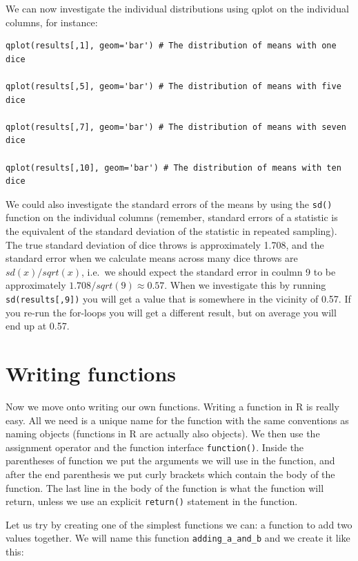\documentclass[
]{book}
\begin{document}
We can now investigate the individual distributions using qplot on the individual columns, for instance:

\begin{verbatim}
qplot(results[,1], geom='bar') # The distribution of means with one dice

qplot(results[,5], geom='bar') # The distribution of means with five dice

qplot(results[,7], geom='bar') # The distribution of means with seven dice

qplot(results[,10], geom='bar') # The distribution of means with ten dice
\end{verbatim}

We could also investigate the standard errors of the means by using the \texttt{sd()} function on the individual columns (remember, standard errors of a statistic is the equivalent of the standard deviation of the statistic in repeated sampling). The true standard deviation of dice throws is approximately 1.708, and the standard error when we calculate means across many dice throws are \(sd(x)/sqrt(x)\), i.e.~we should expect the standard error in coulmn 9 to be approximately \(1.708/sqrt(9)\approx 0.57\). When we investigate this by running \texttt{sd(results{[},9{]})} you will get a value that is somewhere in the vicinity of 0.57. If you re-run the for-loops you will get a different result, but on average you will end up at 0.57.

\hypertarget{writing-functions}{%
\section{Writing functions}\label{writing-functions}}

Now we move onto writing our own functions. Writing a function in R is really easy. All we need is a unique name for the function with the same conventions as naming objects (functions in R are actually also objects). We then use the assignment operator and the function interface \texttt{function()}. Inside the parentheses of function we put the arguments we will use in the function, and after the end parenthesis we put curly brackets which contain the body of the function. The last line in the body of the function is what the function will return, unless we use an explicit \texttt{return()} statement in the function.

Let us try by creating one of the simplest functions we can: a function to add two values together. We will name this function \texttt{adding\_a\_and\_b} and we create it like this:
\end{document}
